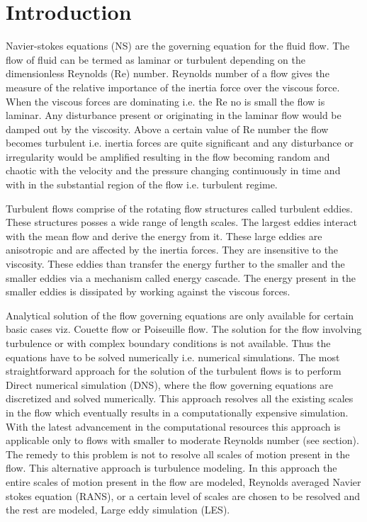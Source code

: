 \newpage

\section{Introduction}
Navier-stokes equations (NS) are the governing equation for the fluid flow. The flow of fluid can be termed as laminar or turbulent depending on the dimensionless Reynolds (Re) number. Reynolds number of a flow gives the measure of the relative importance of the inertia force over the viscous force. When the viscous forces are dominating i.e. the Re no is small the flow is laminar. Any disturbance present or originating in the laminar flow would be damped out by the viscosity. Above a certain value of Re number the flow becomes turbulent i.e. inertia forces are quite significant and any disturbance or irregularity would be amplified resulting in the flow becoming random and chaotic with the velocity and the pressure changing continuously in time and with in the substantial region of the flow i.e. turbulent regime. 

Turbulent flows comprise of the rotating flow structures called turbulent eddies. These structures posses a wide range of length scales. The largest eddies interact with the mean flow and derive the energy from it. These large eddies are anisotropic and are affected by the inertia forces. They are insensitive to the viscosity. These eddies than transfer the energy further to the smaller and the smaller eddies via a mechanism called energy cascade. The energy present in the smaller eddies is dissipated by working against the viscous forces.

Analytical solution of the flow governing equations are only available for certain basic cases viz. Couette flow or Poiseuille flow. The solution for the flow involving turbulence or with complex boundary conditions is not available. Thus the equations have to be solved numerically i.e. numerical simulations. The most straightforward approach for the solution of the turbulent flows is to perform Direct numerical simulation (DNS), where the flow governing equations are discretized and solved numerically. This approach resolves all the existing scales in the flow which eventually results in a computationally expensive simulation. With the latest advancement in the computational resources this approach is applicable only to flows with smaller to moderate Reynolds number (see section). The remedy to this problem is not to resolve all scales of motion present in the flow. This alternative approach is turbulence modeling. In this approach the entire scales of motion present in the flow are modeled, Reynolds averaged Navier stokes equation (RANS), or a certain level of scales are chosen to be resolved and the rest are modeled, Large eddy simulation (LES). 

